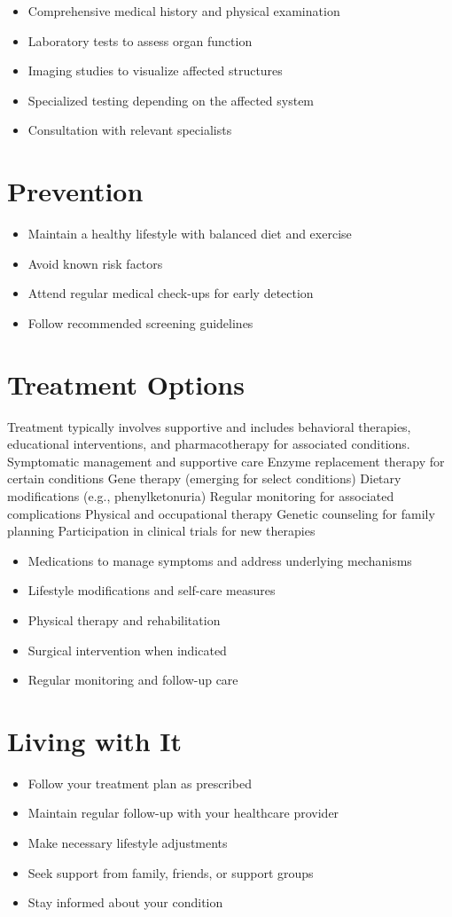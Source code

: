 \begin{itemize}[noitemsep]
  \item Comprehensive medical history and physical examination
  \item Laboratory tests to assess organ function
  \item Imaging studies to visualize affected structures
  \item Specialized testing depending on the affected system
  \item Consultation with relevant specialists
\end{itemize}
\section{Prevention}
\begin{itemize}[noitemsep]
  \item Maintain a healthy lifestyle with balanced diet and exercise
  \item Avoid known risk factors
  \item Attend regular medical check-ups for early detection
  \item Follow recommended screening guidelines
\end{itemize}
\section{Treatment Options}
Treatment typically involves supportive and includes behavioral therapies, educational interventions, and pharmacotherapy for associated conditions. Symptomatic management and supportive care Enzyme replacement therapy for certain conditions Gene therapy (emerging for select conditions) Dietary modifications (e.g., phenylketonuria) Regular monitoring for associated complications Physical and occupational therapy Genetic counseling for family planning Participation in clinical trials for new therapies

\begin{itemize}[noitemsep]
  \item Medications to manage symptoms and address underlying mechanisms
  \item Lifestyle modifications and self-care measures
  \item Physical therapy and rehabilitation
  \item Surgical intervention when indicated
  \item Regular monitoring and follow-up care
\end{itemize}
\section{Living with It}
\begin{itemize}[noitemsep]
  \item Follow your treatment plan as prescribed
  \item Maintain regular follow-up with your healthcare provider
  \item Make necessary lifestyle adjustments
  \item Seek support from family, friends, or support groups
  \item Stay informed about your condition
\end{itemize}
